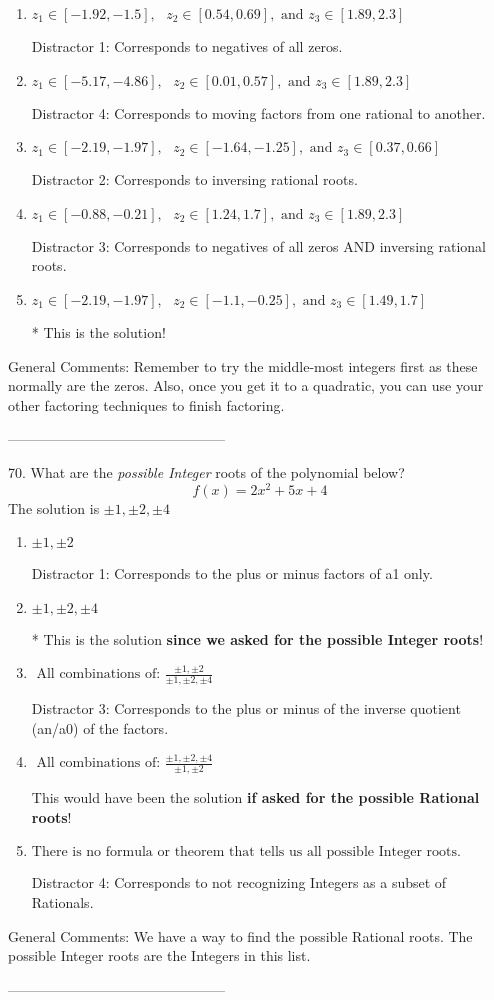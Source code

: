 \documentclass{extbook}[14pt]
\begin{document}
\begin{enumerate}[label=\Alph*.] 
\item $ z_1 \in [-1.92, -1.5], \text{   }  z_2 \in [0.54, 0.69], \text{   and   } z_3 \in [1.89, 2.3] $ 

  Distractor 1: Corresponds to negatives of all zeros. 
\item $ z_1 \in [-5.17, -4.86], \text{   }  z_2 \in [0.01, 0.57], \text{   and   } z_3 \in [1.89, 2.3] $ 

  Distractor 4: Corresponds to moving factors from one rational to another. 
\item $ z_1 \in [-2.19, -1.97], \text{   }  z_2 \in [-1.64, -1.25], \text{   and   } z_3 \in [0.37, 0.66] $ 

  Distractor 2: Corresponds to inversing rational roots. 
\item $ z_1 \in [-0.88, -0.21], \text{   }  z_2 \in [1.24, 1.7], \text{   and   } z_3 \in [1.89, 2.3] $ 

  Distractor 3: Corresponds to negatives of all zeros AND inversing rational roots. 
\item $ z_1 \in [-2.19, -1.97], \text{   }  z_2 \in [-1.1, -0.25], \text{   and   } z_3 \in [1.49, 1.7] $ 

 * This is the solution! 
\end{enumerate} 
 
General Comments: Remember to try the middle-most integers first as these normally are the zeros. Also, once you get it to a quadratic, you can use your other factoring techniques to finish factoring.

-----------------------------------------------

70. What are the \textit{possible Integer} roots of the polynomial below?
\[ f(x) = 2x^{2} +5 x + 4 \] 
The solution is $ \pm 1,\pm 2,\pm 4 $ 

\begin{enumerate}[label=\Alph*.] 
\item $ \pm 1,\pm 2 $ 

  Distractor 1: Corresponds to the plus or minus factors of a1 only. 
\item $ \pm 1,\pm 2,\pm 4 $ 

 * This is the solution \textbf{since we asked for the possible Integer roots}! 
\item $ \text{ All combinations of: }\frac{\pm 1,\pm 2}{\pm 1,\pm 2,\pm 4} $ 

  Distractor 3: Corresponds to the plus or minus of the inverse quotient (an/a0) of the factors.  
\item $ \text{ All combinations of: }\frac{\pm 1,\pm 2,\pm 4}{\pm 1,\pm 2} $ 

 This would have been the solution \textbf{if asked for the possible Rational roots}! 
\item $ \text{There is no formula or theorem that tells us all possible Integer roots.} $ 

  Distractor 4: Corresponds to not recognizing Integers as a subset of Rationals. 
\end{enumerate} 
 
General Comments: We have a way to find the possible Rational roots. The possible Integer roots are the Integers in this list.

-----------------------------------------------
\end{document}
